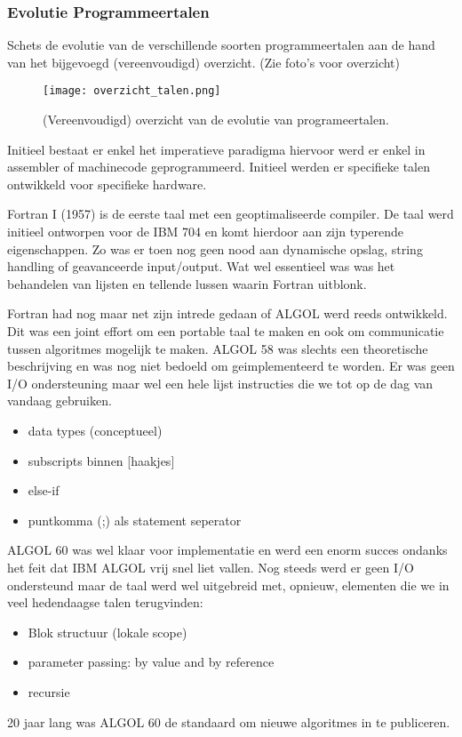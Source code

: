 \documentclass[../main.tex]{subfiles}
\begin{document}
\subsubsection{Evolutie Programmeertalen}
\begin{question}
Schets de evolutie van de verschillende soorten programmeertalen aan de hand van het bijgevoegd (vereenvoudigd) overzicht. (Zie foto's voor overzicht)
\begin{figure}
		\centering
		\texttt{[image: overzicht\_talen.png]}
		\caption{(Vereenvoudigd) overzicht van de evolutie van programeertalen.}
\end{figure}
\end{question}
\begin{solution}
Initieel bestaat er enkel het imperatieve paradigma hiervoor werd er enkel in assembler of machinecode geprogrammeerd.
Initieel werden er specifieke talen ontwikkeld voor specifieke hardware.

Fortran I (1957) is de eerste taal met een geoptimaliseerde compiler.
De taal werd initieel ontworpen voor de IBM 704 en komt hierdoor aan zijn typerende eigenschappen.
Zo was er toen nog geen nood aan dynamische opslag, string handling of geavanceerde input/output.
Wat wel essentieel was was het behandelen van lijsten en tellende lussen waarin Fortran uitblonk.

Fortran had nog maar net zijn intrede gedaan of ALGOL werd reeds ontwikkeld.
Dit was een joint effort om een portable taal te maken en ook om communicatie tussen algoritmes mogelijk te maken.
ALGOL 58 was slechts een theoretische beschrijving en was nog niet bedoeld om geimplementeerd te worden.
Er was geen I/O ondersteuning maar wel een hele lijst instructies die we tot op de dag van vandaag gebruiken.
\begin{itemize}
		\item data types (conceptueel)
		\item subscripts binnen [haakjes]
		\item else-if
		\item puntkomma (;) als statement seperator
\end{itemize}
ALGOL 60 was wel klaar voor implementatie en werd een enorm succes ondanks het feit dat IBM ALGOL vrij snel liet vallen.
Nog steeds werd er geen I/O ondersteund maar de taal werd wel uitgebreid met, opnieuw, elementen die we in veel hedendaagse talen terugvinden:
\begin{itemize}
		\item Blok structuur (lokale scope)
		\item parameter passing: by value and by reference
		\item recursie
\end{itemize}
20 jaar lang was ALGOL 60 de standaard om nieuwe algoritmes in te publiceren.


\end{solution}
\end{document}
